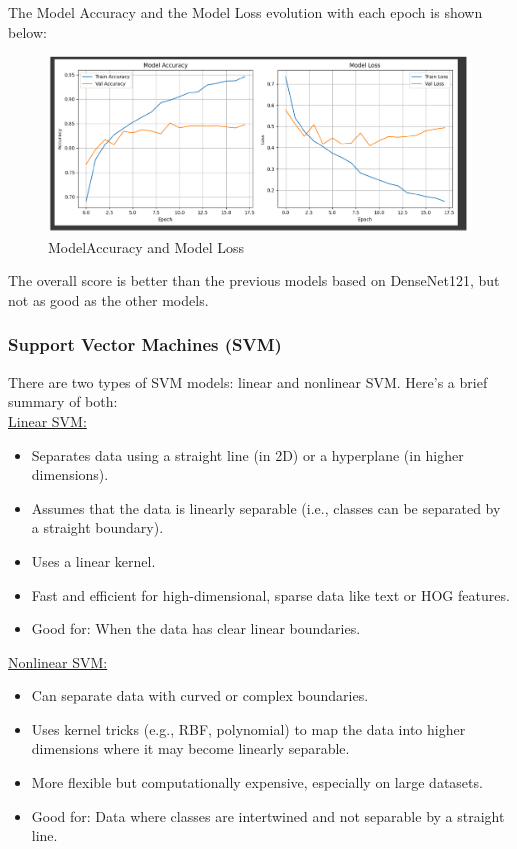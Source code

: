 \documentclass{article}
\begin{document}
The Model Accuracy and the Model Loss evolution with each epoch is shown below:

\begin{figure}[H]
    \centering
    \includegraphics[width=0.8\linewidth]{DN121graph2.png}
    \caption{ModelAccuracy and Model Loss}
    \label{fig:DN121graph2}
\end{figure}

The overall score is  better than the previous models based on DenseNet121, but not as good as the other models.

\subsubsection{Support Vector Machines (SVM)}
There are two types of SVM models: linear and nonlinear SVM. Here's a brief summary of both: \\
\underline{Linear SVM:}
\begin{itemize}
    \item Separates data using a straight line (in 2D) or a hyperplane (in higher dimensions).
    \item Assumes that the data is linearly separable (i.e., classes can be separated by a straight boundary).
    \item Uses a linear kernel.
    \item Fast and efficient for high-dimensional, sparse data like text or HOG features.
    \item Good for: When the data has clear linear boundaries.
\end{itemize}
\underline{Nonlinear SVM:}
\begin{itemize}
    \item Can separate data with curved or complex boundaries.
    \item Uses kernel tricks (e.g., RBF, polynomial) to map the data into higher dimensions where it may become linearly separable.
    \item More flexible but computationally expensive, especially on large datasets.
    \item Good for: Data where classes are intertwined and not separable by a straight line.
\end{itemize}
\end{document}
